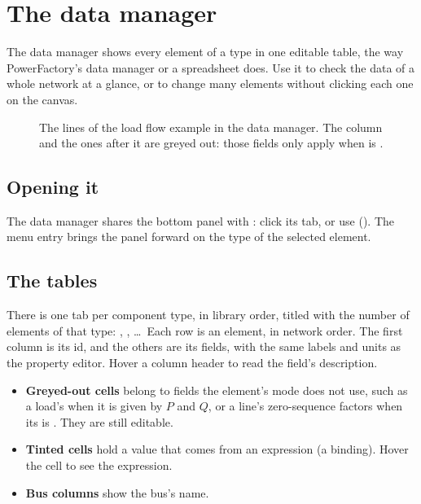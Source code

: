 \chapter{The data manager}\label{ch:data-manager}

The data manager shows every element of a type in one editable table, the way
PowerFactory's data manager or a spreadsheet does. Use it to check the data of a whole
network at a glance, or to change many elements without clicking each one on the canvas.

\begin{figure}[H]
  \centering{}
  \caption{The lines of the load flow example in the data manager. The 
    column and the ones after it are greyed out: those fields only apply when  is .}
\end{figure}

\section{Opening it}

The data manager shares the bottom panel with : click its tab, or use
 (). The menu entry brings the panel
forward on the type of the selected element.

\section{The tables}

There is one tab per component type, in library order, titled with the number of
elements of that type: , , \dots\ Each row is an
element, in network order. The first column is its id, and the others are its fields,
with the same labels and units as the property editor. Hover a column header to read the
field's description.

\begin{itemize}
  \item \textbf{Greyed-out cells} belong to fields the element's mode does not use, such as
    a load's  when it is given by $P$ and $Q$, or a line's zero-sequence
    factors when its  is . They are still editable.
  \item \textbf{Tinted cells} hold a value that comes from an expression (a binding).
    Hover the cell to see the expression.
  \item \textbf{Bus columns} show the bus's name.
\end{itemize}

